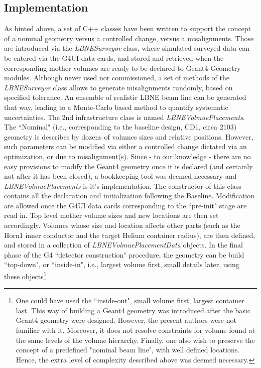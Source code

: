 \subsection{Implementation}  As hinted above, a set of C++ classes have been written to support the concept of a nominal geometry versus a controlled change, versus a misalignments. Those  are introduced via the {\em LBNESurveyor} class, where simulated surveyed data can be entered via the G4UI data cards, and stored and retrieved when the  corresponding mother volumes are ready to be declared to Geant4 Geometry modules. Although never used nor commissioned, a set of methods of the {\em LBNESurveyor}  class allows to generate misalignments randomly, based on specified tolerance. An ensemble of realistic LBNE beam line can be generated that way, leading to a  Monte-Carlo based method to quantify systematic uncertainties.    The 2nd infrastructure class is named {\em LBNEVolmuePlacements}. The ``Nominal" (i.e., corresponding to the baseline design, CD1, circa 2103) geometry is   describes by dozens of volumes sizes and relative positions. However, such parameters can be modified via either a controlled change dictated via an   optimization, or due to misalignment(s).  Since - to our knowledge - there are no easy provisions to modify the Geant4 geometry once it is declared (and   certainly not after it has been closed), a bookkeeping tool was deemed necessary and {\em LBNEVolmuePlacements} is it's implementation. The constructor of this   class contains all the declaration and initialization following the Baseline. Modification are allowed once the G4UI data cards corresponding to the ``pre-init"   stage are read in. Top level mother volume sizes and new locations are then set accordingly.  Volumes whose size and location affects other parts (such as the   Horn1 inner conductor and the target Helium container radius), are then defined, and stored in a collection of {\em LBNEVolmuePlacementData}  objects. In the   final phase of the G4 ``detector construction" procedure, the geometry can be build ``top-down", or ``inside-in",  i.e.,  largest volume first, small details   later, using these objects\footnote{One could have used the ``inside-out", small volume first, largest container last.  This way of building a Geant4 geometry   was  introduced after the basic Geant4 geometry were designed.  However, the present authors were not familiar with it.  Moreover, it does not resolve   constraints for volume found at the same levels of the volume hierarchy.  Finally, one also wish to preserve the concept of a predefined "nominal beam line",   with well defined locations. Hence, the extra level of complexity described above was deemed necessary.}    


